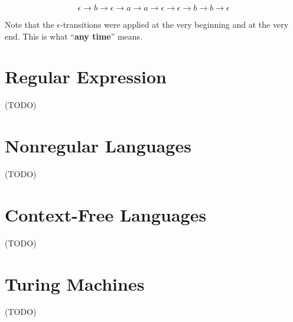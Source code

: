 \documentclass[12pt, letterpaper, oneside]{book}
\begin{document}
\[
  \epsilon \rightarrow b \rightarrow \epsilon \rightarrow a \rightarrow a \rightarrow \epsilon \rightarrow \epsilon
  \rightarrow b \rightarrow b \rightarrow \epsilon
\]

Note that the $\epsilon$-transitions were applied at the very beginning and at the very end. This is what ``\textbf{any
  time}'' means.

%
%

\chapter{Regular Expression}

 (TODO)

%
%

\chapter{Nonregular Languages}

 (TODO)

%
%

\chapter{Context-Free Languages}

 (TODO)

%
%

\chapter{Turing Machines}

 (TODO)

%
%
\end{document}
